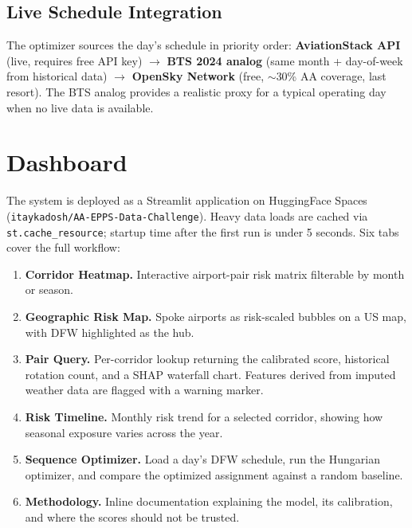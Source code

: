 \documentclass[11pt, twoside]{article}
\begin{document}
\subsection{Live Schedule Integration}

The optimizer sources the day's schedule in priority order:
\textbf{AviationStack API} (live, requires free API key) $\to$
\textbf{BTS 2024 analog} (same month + day-of-week from historical data) $\to$
\textbf{OpenSky Network} (free, $\sim$30\% AA coverage, last resort).
The BTS analog provides a realistic proxy for a typical operating day when no
live data is available.


\clearpage
\section{Dashboard}
\label{sec:dashboard}

The system is deployed as a Streamlit application on HuggingFace Spaces
(\texttt{itaykadosh/AA-EPPS-Data-Challenge}).  Heavy data loads are cached
via \texttt{st.cache\_resource}; startup time after the first run is under
5 seconds.  Six tabs cover the full workflow:

\begin{enumerate}
  \item \textbf{Corridor Heatmap.} Interactive airport-pair risk matrix filterable
        by month or season.
  \item \textbf{Geographic Risk Map.} Spoke airports as risk-scaled bubbles on a
        US map, with DFW highlighted as the hub.
  \item \textbf{Pair Query.} Per-corridor lookup returning the calibrated score,
        historical rotation count, and a SHAP waterfall chart.  Features derived
        from imputed weather data are flagged with a warning marker.
  \item \textbf{Risk Timeline.} Monthly risk trend for a selected corridor,
        showing how seasonal exposure varies across the year.
  \item \textbf{Sequence Optimizer.} Load a day's DFW schedule, run the Hungarian
        optimizer, and compare the optimized assignment against a random baseline.
  \item \textbf{Methodology.} Inline documentation explaining the model, its
        calibration, and where the scores should not be trusted.
\end{enumerate}
\end{document}
